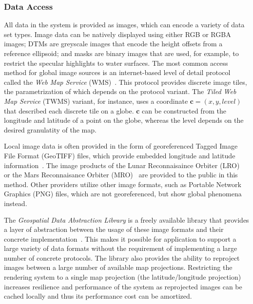 \subsubsection{Data Access} \label{contributions:astro:gb:access}
All data in the system is provided as  images, which can encode a variety of data set types.  Image data can be natively displayed using either RGB or RGBA images;  DTMs are greyscale images that encode the height offsets from a reference ellipsoid;  and masks are binary images that are used, for example, to restrict the specular highlights to water surfaces.  The most common access method for global image sources is an internet-based level of detail protocol called the \emph{Web Map Service} (WMS)~\cite{open2006opengis, maso2010opengis}.  This protocol provides discrete image tiles, the parametrization of which depends on the protocol variant.  The \emph{Tiled Web Map Service} (TWMS) variant, for instance, uses a  coordinate $\textbf{c} = (x,y,level)$ that described each discrete tile on a globe.  $\textbf{c}$ can be constructed from the longitude and latitude of a point on the globe, whereas the level depends on the desired granulatity of the map.

Local image data is often provided in the form of georeferenced Tagged Image File Format (GeoTIFF) files, which provide embedded longitude and latitude information~\cite{ritter2000geotiff}.  The image products of the Lunar Reconnaisaince Orbiter (LRO)~\cite{vondrak2010lunar} or the Mars Reconnaisance Orbiter (MRO)~\cite{mcewen2016people} are provided to the public in this method.  Other providers utilize other image formats, such as Portable Network Graphics (PNG) files, which are not georeferenced, but show global phenomena instead.

The \emph{Geospatial Data Abstraction Library} is a freely available library that provides a layer of abstraction between the usage of these image formats and their concrete implementation~\cite{warmerdam2008geospatial}.  This makes it possible for application to support a large variety of data formats without the requirement of implementing a large number of concrete protocols.  The library also provides the ability to reproject images between a large number of available map projections.  Restricting the rendering system to a single map projection (the latitude/longitude projection) increases resilience and performance of the system as reprojected images can be cached locally and thus its performance cost can be amortized.



